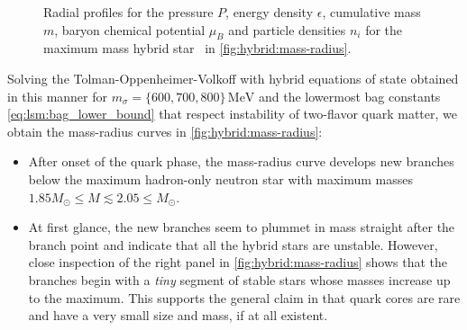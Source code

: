 \begin{figure}
\caption{\label{fig:hybrid:star}%
	Radial profiles for the
	pressure $P$,
	energy density $\epsilon$,
	cumulative mass $m$,
	baryon chemical potential $\mu_B$
	and particle densities $n_i$
	for the maximum mass hybrid star \goldenstar in \cref{fig:hybrid:mass-radius}.
}

\end{figure}

Solving the Tolman-Oppenheimer-Volkoff with hybrid equations of state obtained in this manner
for $m_\sigma=\{600,700,800\} \, \si{\mega\electronvolt}$ and the lowermost bag constants \eqref{eq:lsm:bag_lower_bound} that respect instability of two-flavor quark matter,
we obtain the mass-radius curves in \cref{fig:hybrid:mass-radius}:
\begin{itemize}
\item After onset of the quark phase, the mass-radius curve develops new branches below the maximum hadron-only neutron star
      with maximum masses $1.85 M_\odot \leq M \lesssim 2.05 \leq M_\odot$.
\item At first glance, the new branches seem to plummet in mass straight after the branch point and indicate that all the hybrid stars are unstable.
      However, close inspection of the right panel in \cref{fig:hybrid:mass-radius} shows that the branches begin with a \emph{tiny} segment of stable stars whose masses increase up to the maximum.
      This supports the general claim in \cite{ref:quark_star_review} that quark cores are rare and have a very small size and mass, if at all existent.
\end{itemize}

